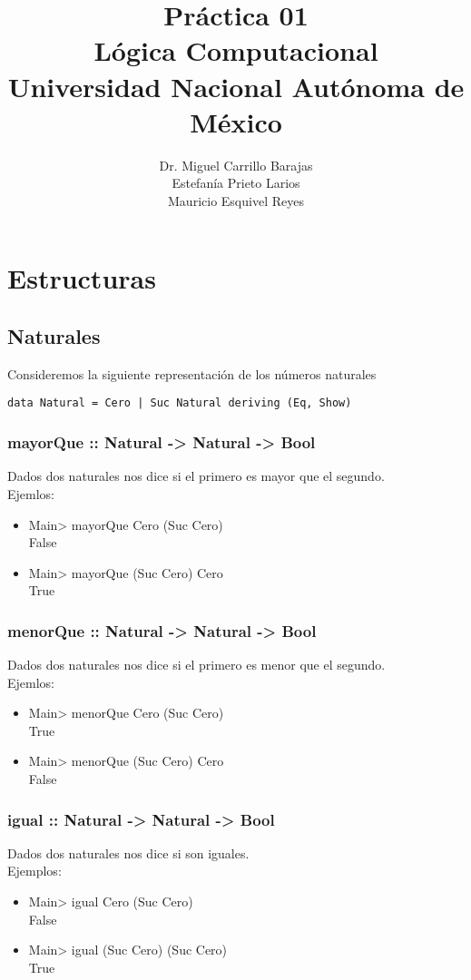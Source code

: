 \documentclass[11pt]{article}
\author{Dr. Miguel Carrillo Barajas \\
Estefanía Prieto Larios \\
Mauricio Esquivel Reyes \\
}
\date{}
\title{Práctica 01 \\
Lógica Computacional \\
Universidad Nacional Autónoma de México}
\begin{document}
\maketitle
\section{Estructuras}
\label{sec:org43fe393}
\subsection{Naturales}
\label{sec:org90c0d76}
Consideremos la siguiente representación de los números naturales

\begin{verbatim}
data Natural = Cero | Suc Natural deriving (Eq, Show)
\end{verbatim}
\subsubsection{mayorQue :: Natural -> Natural -> Bool}
\label{sec:org40f8f56}
Dados dos naturales nos dice si el primero es mayor que el segundo.\\
Ejemlos:
\begin{itemize}
\item Main> mayorQue Cero (Suc Cero)\\
False
\item Main> mayorQue (Suc Cero) Cero\\
True
\end{itemize}
\subsubsection{menorQue :: Natural -> Natural -> Bool}
\label{sec:org9ccf5f7}
Dados dos naturales nos dice si el primero es menor que el segundo.\\
Ejemlos:
\begin{itemize}
\item Main> menorQue Cero (Suc Cero)\\
True
\item Main> menorQue (Suc Cero) Cero\\
False
\end{itemize}
\subsubsection{igual :: Natural -> Natural -> Bool}
\label{sec:orgf7f5429}
Dados dos naturales nos dice si son iguales.\\
Ejemplos:
\begin{itemize}
\item Main> igual Cero (Suc Cero)\\
False
\item Main> igual (Suc Cero) (Suc Cero)\\
True
\end{itemize}
\end{document}
